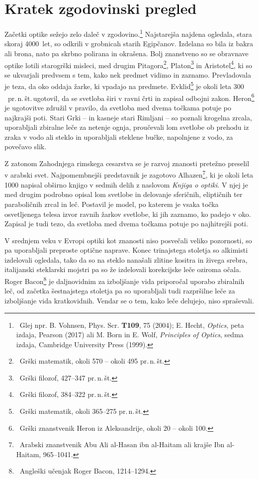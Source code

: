 \section{Kratek zgodovinski pregled}
Začetki optike sežejo zelo daleč v zgodovino.\footnote{~Glej 
npr. B. Vohnsen, Phys. Scr. {\bf T109}, 75 (2004); 
E. Hecht, {\it Optics}, peta izdaja, Pearson (2017) ali
M. Born in E. Wolf, {\it Principles of Optics}, sedma izdaja, 
Cambridge University Press (1999).} Najstarejša najdena ogledala, 
stara skoraj 4000~let, so odkrili v grobnicah starih Egipčanov. 
Izdelana so bila iz bakra ali brona, nato pa skrbno polirana in okrašena. 
Bolj znanstveno so se obravnave optike lotili starogrški
misleci, med drugim Pitagora\footnote{~Grški 
matematik, okoli 570 -- okoli 495 pr.\,n.\,št.}, Platon\footnote{~Grški 
filozof, 427--347 pr.\,n.\,št.} in Aristotel\footnote{~Grški 
filozof, 384--322 pr.\,n.\,št.}, ki so se 
ukvarjali predvsem s tem, kako nek predmet vidimo in zaznamo. Prevladovala
je teza, da oko oddaja žarke, ki vpadajo na predmete.
Evklid\footnote{~Grški 
matematik, okoli 365--275 pr.\,n.\,št.} je okoli leta $300$~pr.\,n.\,št.\,ugotovil, 
da se svetloba širi v ravni črti in zapisal odbojni zakon. Heron\footnote{~Grški 
znanstvenik Heron iz Aleksandrije, okoli 20 -- okoli 100.} je ugotovitve združil
v pravilo, da svetloba med dvema točkama potuje po najkrajši poti.
Stari Grki -- in kasneje stari Rimljani -- so poznali krogelna zrcala, 
uporabljali zbiralne leče za netenje ognja, 
proučevali lom svetlobe ob prehodu iz zraka v vodo ali steklo
in uporabljali steklene bučke, napolnjene z vodo, za povečavo slik.

Z zatonom Zahodnjega rimskega cesarstva se je razvoj znanosti pretežno 
preselil v arabski svet. Najpomembnejši predstavnik je zagotovo 
Alhazen\footnote{~Arabski znanstvenik Abu 
Ali al-Hasan ibn al-Haitam ali krajše Ibn al-Haitam, 965--1041.}, 
ki je okoli leta 1000 napisal obširno knjigo v sedmih delih
z naslovom {\it Knjiga o optiki}. 
V njej je med drugim podrobno opisal lom svetlobe in delovanje sferičnih,
eliptičnih ter paraboličnih zrcal in leč. Postavil je model, 
po katerem je vsaka točka osvetljenega telesa izvor
ravnih žarkov svetlobe, ki jih zaznamo, ko padejo v oko. 
Zapisal je tudi tezo, da svetloba med dvema točkama potuje po najhitrejši poti.

V srednjem veku v Evropi optiki kot znanosti niso posvečali veliko
pozornosti, so pa uporabljali preproste optične naprave. 
Konec trinajstega stoletja so alkimisti izdelovali ogledala, 
tako da so na steklo nanašali zlitine kositra in živega srebra, 
italijanski steklarski mojstri pa so že izdelovali korekcijske leče 
oziroma očala. Roger Bacon\footnote{~Angleški učenjak Roger Bacon, 1214--1294.}
je daljnovidnim za izboljšanje vida priporočal uporabo zbiralnih leč, 
od začetka šestnajstega stoletja pa so uporabljali tudi razpršilne leče
za izboljšanje vida kratkovidnih. Vendar se o tem, kako leče delujejo, 
niso spraševali. 

